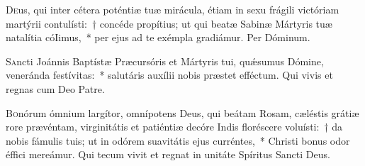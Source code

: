 \documentclass[vesperale_romanum.tex]{subfiles}
\begin{document}
\oratio

\lettrine{D}{e}us, qui inter cétera poténtiæ tuæ mirácula, étiam in sexu frágili vi\-ctóriam martýrii contulísti:~† concéde propítius; ut qui beatæ Sabinæ Mártyris tuæ natalítia cóIimus,~* per ejus ad te exémpla gradiámur. Per Dóminum.









\admagnificat



\oratio

\lettrine{S}{a}ncti Joánnis Baptístæ Præcursóris et Mártyris tui, quǽsumus Dómine, veneránda festívitas:~* salutáris auxílii nobis præstet effé\-ctum. Qui vivis et regnas cum Deo Patre.


\myrule


\duplex


\oratio

\lettrine{B}{o}nórum ómnium largítor, omnípotens Deus, qui beátam Rosam, cæléstis grátiæ rore prævéntam, virginitátis et patiéntiæ decóre Indis floréscere voluísti:~† da nobis fámulis tuis; ut in odórem suavitátis ejus curréntes,~* Christi bonus odor éffici mereámur. Qui tecum vivit et regnat in unitáte Spíritus San\-cti Deus.

\end{document}
